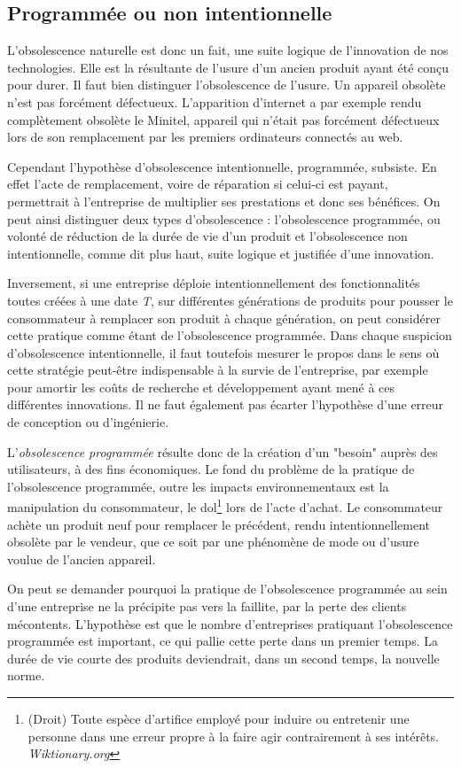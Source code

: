 \subsection{Programmée ou non intentionnelle}

L'obsolescence naturelle est donc un fait, une suite logique de l'innovation de nos technologies. Elle est la résultante de l'usure d'un ancien produit ayant été conçu pour durer.
Il faut bien distinguer l’obsolescence de l’usure. Un appareil obsolète n’est pas forcément défectueux. L’appa\-rition d’internet a par exemple rendu complètement obsolète le Minitel, appareil qui n'était pas forcément défectueux lors de son remplacement par les premiers ordinateurs connectés au web. 

\bigbreak
Cependant l'hypothèse d'obsolescence intentionnelle, programmée, subsiste. 
En effet l'acte de remplacement, voire de réparation si celui-ci est payant, permettrait à l'entreprise de multiplier ses prestations et donc ses bénéfices. 
On peut ainsi distinguer deux types d'obsolescence : l'obsolescence programmée, ou volonté de réduction de la durée de vie d’un produit et l'obsolescence non intentionnelle, comme dit plus haut, suite logique et justifiée d’une innovation.

\bigbreak
Inversement, si une entreprise déploie intentionnellement des fonctionnalités toutes créées à une date \textit{T}, sur différentes générations de produits pour pousser le consommateur à remplacer son produit à chaque génération, on peut considérer cette pratique comme étant de l'obsolescence programmée. Dans chaque suspicion d’obsolescence intentionnelle, il faut toutefois mesurer le propos dans le sens où cette stratégie peut-être indispensable à la survie de l’entreprise, par exemple pour amortir les coûts de recherche et développement ayant mené à ces différentes innovations. Il ne faut également pas écarter l’hypothèse d’une erreur de conception ou d'ingénierie.

\medbreak
L'\textit{obsolescence programmée} résulte donc de la création d'un "besoin" auprès des utilisateurs, à des fins économiques. Le fond du problème de la pratique de l'obsolescence programmée, outre les impacts environnementaux est la manipulation du consommateur, le dol\footnote{(Droit) Toute espèce d’artifice employé pour induire ou entretenir une personne dans une erreur propre à la faire agir contrairement à ses intérêts. \textit{Wiktionary.org}} lors de l'acte d'achat. Le consommateur achète un produit neuf pour remplacer le précédent, rendu intentionnellement obsolète par le vendeur, que ce soit par une phénomène de mode ou d'usure voulue de l’ancien appareil.%

\bigbreak
On peut se demander pourquoi la pratique de l’obsolescence programmée au sein d’une entreprise ne la précipite pas vers la faillite, par la perte des clients mécontents. L’hypothèse est que le nombre d’entreprises pratiquant l’obsolescence programmée est important, ce qui pallie cette perte dans un premier temps. La durée de vie courte des produits deviendrait, dans un second temps, la nouvelle norme.
